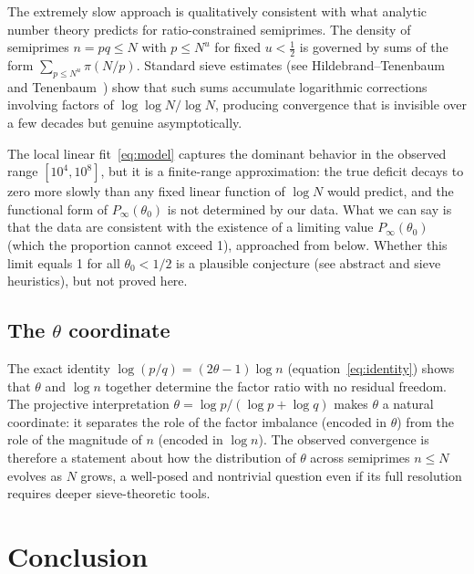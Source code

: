 \documentclass[11pt]{article}
\theoremstyle{definition}
\begin{document}
The extremely slow approach is qualitatively consistent with what analytic number
theory predicts for ratio-constrained semiprimes.  The density of semiprimes
\(n = pq \leq N\) with \(p \leq N^{u}\) for fixed \(u < \tfrac{1}{2}\) is governed
by sums of the form \(\sum_{p \leq N^u} \pi(N/p)\).  Standard sieve estimates
(see Hildebrand--Tenenbaum~\cite{hildebrand1993} and Tenenbaum~\cite{tenenbaum1995})
show that such sums accumulate logarithmic corrections involving factors of
\(\log\log N / \log N\), producing convergence that is invisible over a few decades
but genuine asymptotically.

The local linear fit~\eqref{eq:model} captures the dominant behavior in the observed
range \([10^4, 10^8]\), but it is a finite-range approximation: the true deficit
decays to zero more slowly than any fixed linear function of \(\log N\) would predict,
and the functional form of \(P_\infty(\theta_0)\) is not determined by our data.
What we can say is that the data are consistent with the existence of a limiting value
\(P_\infty(\theta_0)\) (which the proportion cannot exceed 1), approached from below.
Whether this limit equals 1 for all \(\theta_0<1/2\) is a plausible conjecture (see
abstract and sieve heuristics), but not proved here.

\subsection{The \(\theta\) coordinate}

The exact identity \(\log(p/q) = (2\theta-1)\log n\) (equation~\eqref{eq:identity})
shows that \(\theta\) and \(\log n\) together determine the factor ratio with no
residual freedom.  The projective interpretation \(\theta = \log p / (\log p + \log q)\)
makes \(\theta\) a natural coordinate: it separates the role of the factor imbalance
(encoded in \(\theta\)) from the role of the magnitude of \(n\) (encoded in \(\log n\)).
The observed convergence is therefore a statement about how the distribution of
\(\theta\) across semiprimes \(n \leq N\) evolves as \(N\) grows, a well-posed and
nontrivial question even if its full resolution requires deeper sieve-theoretic tools.

\section{Conclusion}
\end{document}
